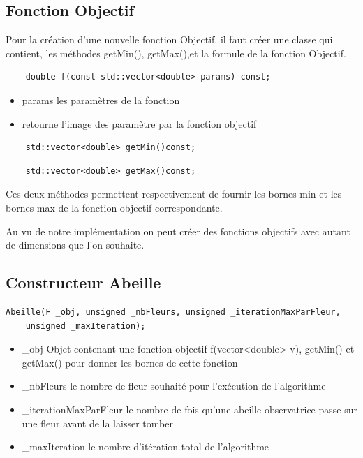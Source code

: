 \documentclass[12pt]{article}
\begin{document}
\subsection{Fonction Objectif}
Pour la création d'une nouvelle fonction Objectif, il faut créer une classe qui contient, les méthodes getMin(), getMax(),et la formule de la fonction Objectif.

  \begin{lstlisting}
    double f(const std::vector<double> params) const;
  \end{lstlisting}
    \begin{itemize}
      \item params les paramètres de la fonction
      \item  retourne l'image des paramètre par la fonction objectif
    \end{itemize}
  \begin{lstlisting}
  	std::vector<double> getMin()const;
  \end{lstlisting}
  \begin{lstlisting}
	std::vector<double> getMax()const;
  \end{lstlisting}
  Ces deux méthodes permettent respectivement de fournir les bornes min et les bornes max de la fonction objectif correspondante.
  
  Au vu de notre implémentation on peut créer des fonctions objectifs avec autant de dimensions que l'on souhaite.
  

\subsection{Constructeur Abeille}
\begin{lstlisting}
Abeille(F _obj, unsigned _nbFleurs, unsigned _iterationMaxParFleur,
	unsigned _maxIteration);
\end{lstlisting}
\begin{itemize}
	\item \_obj Objet contenant une fonction objectif f(vector<double> v), getMin() et getMax() pour donner les bornes de cette fonction
    \item  \_nbFleurs le nombre de fleur souhaité pour l'exécution de l'algorithme
    \item \_iterationMaxParFleur le nombre de fois qu'une abeille observatrice passe sur une fleur avant de la laisser tomber
    \item \_maxIteration le nombre d'itération total de l'algorithme
    \end{itemize}
    
\end{document}
